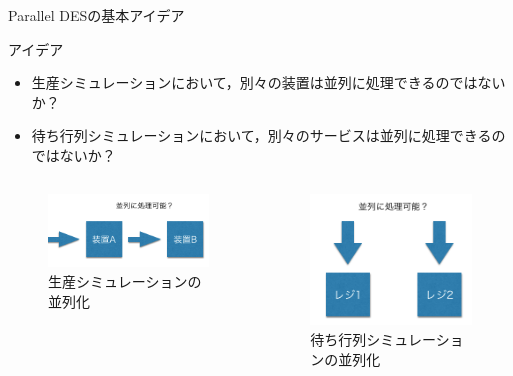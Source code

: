 \documentclass[dvipdfmx,uplatex,11pt]{beamer}
\theoremstyle{definition}
\begin{document}
\begin{frame}{Parallel DESの基本アイデア}
  \begin{block}{アイデア}
    \begin{itemize}
      \item 生産シミュレーションにおいて，別々の装置は並列に処理できるのではないか？
      \item 待ち行列シミュレーションにおいて，別々のサービスは並列に処理できるのではないか？
    \end{itemize}
  \end{block}
  \begin{columns}
    \begin{column}{0.5\textwidth}
      \begin{figure}[htb]
        \includegraphics[scale=0.5]{machine_para.png}
      \caption{生産シミュレーションの並列化}
      \end{figure}
    \end{column}
    \begin{column}{0.5\textwidth}
      \begin{figure}
        \includegraphics[scale=0.5]{queue_para.png}
        \caption{待ち行列シミュレーションの並列化}
      \end{figure}
    \end{column}
  \end{columns}
\end{frame}
\end{document}
